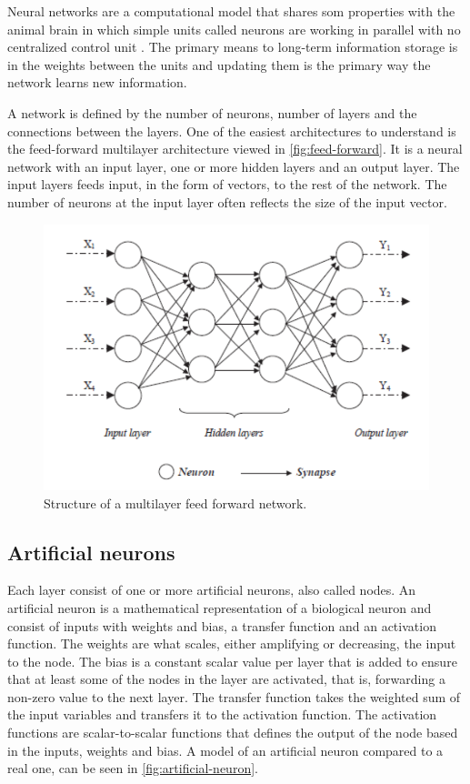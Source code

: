 Neural networks are a computational model that shares som properties with the animal brain in which simple units called neurons are working in parallel with no centralized control unit \cite{Patterson2017}. The primary means to long-term information storage is in the weights between the units and updating them is the primary way the network learns new information.

A network is defined by the number of neurons, number of layers and the connections between the layers. One of the easiest architectures to understand is the feed-forward multilayer architecture viewed in \autoref{fig:feed-forward}. It is a neural network with an input layer, one or more hidden layers and an output layer. The input layers feeds input, in the form of vectors, to the rest of the network. The number of neurons at the input layer often reflects the size of the input vector.

\begin{figure}[H]
	\centering
	\includegraphics[width=0.6\linewidth]{fig/feedforward-neural-network.png}
	\caption{Structure of a multilayer feed forward network. \cite{Zangeneh2011}}
	\label{fig:feed-forward}
\end{figure}

\subsection{Artificial neurons}
Each layer consist of one or more artificial neurons, also called nodes. An artificial neuron is a mathematical representation of a biological neuron and consist of inputs with weights and bias, a transfer function and an activation function. The weights are what scales, either amplifying or decreasing, the input to the node. The bias is a constant scalar value per layer that is added to ensure that at least some of the nodes in the layer are activated, that is, forwarding a non-zero value to the next layer. The transfer function takes the weighted sum of the input variables and transfers it to the activation function. The activation functions are scalar-to-scalar functions that defines the output of the node based in the inputs, weights and bias. A model of an artificial neuron compared to a real one, can be seen in \autoref{fig:artificial-neuron}. 


